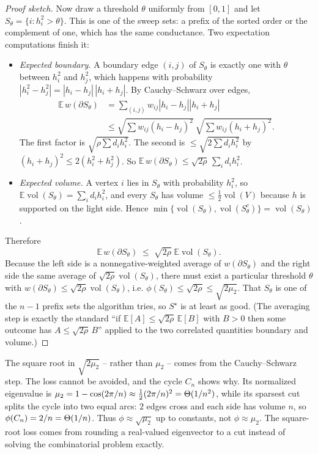 \begin{proof}[Proof sketch]
Now draw a threshold $\theta$ uniformly from $[0,1]$ and let $S_\theta=\{i:h_i^2>\theta\}$. This is one of the sweep sets: a prefix of the sorted order or the complement of one, which has the same conductance. Two expectation computations finish it:
\begin{itemize}
  \item \emph{Expected boundary.} A boundary edge $(i,j)$ of $S_\theta$ is exactly one with $\theta$ between $h_i^2$ and $h_j^2$, which happens with probability $|h_i^2-h_j^2|=|h_i-h_j|\,|h_i+h_j|$. By Cauchy--Schwarz over edges,
  \begin{align*}
    \mathbb{E}\,w(\partial S_\theta)
      &= \sum_{(i,j)}w_{ij}|h_i-h_j||h_i+h_j| \\
      &\le \sqrt{\sum w_{ij}(h_i-h_j)^2}\ \sqrt{\sum w_{ij}(h_i+h_j)^2}.
  \end{align*}
  The first factor is $\sqrt{\rho\sum d_i h_i^2}$. The second is $\le\sqrt{2\sum d_i h_i^2}$ by $(h_i+h_j)^2\le 2(h_i^2+h_j^2)$. So $\mathbb{E}\,w(\partial S_\theta)\le\sqrt{2\rho}\,\sum_i d_i h_i^2$.
  \item \emph{Expected volume.} A vertex $i$ lies in $S_\theta$ with probability $h_i^2$, so $\mathbb{E}\operatorname{vol}(S_\theta)=\sum_i d_i h_i^2$, and every $S_\theta$ has volume $\le\tfrac12\operatorname{vol}(V)$ because $h$ is supported on the light side. Hence $\min\{\operatorname{vol}(S_\theta),\operatorname{vol}(S_\theta^c)\}=\operatorname{vol}(S_\theta)$.
\end{itemize}
Therefore
\[
  \mathbb{E}\,w(\partial S_\theta)
   \;\le\; \sqrt{2\rho}\;\mathbb{E}\operatorname{vol}(S_\theta).
\]
Because the left side is a nonnegative-weighted average of $w(\partial S_\theta)$ and the right side the same average of $\sqrt{2\rho}\operatorname{vol}(S_\theta)$, there must exist a particular threshold $\theta$ with $w(\partial S_\theta)\le\sqrt{2\rho}\operatorname{vol}(S_\theta)$, i.e. $\phi(S_\theta)\le\sqrt{2\rho}\le\sqrt{2\mu_2}$. That $S_\theta$ is one of the $n-1$ prefix sets the algorithm tries, so $S^\star$ is at least as good. (The averaging step is exactly the standard ``if $\mathbb{E}[A]\le\sqrt{2\rho}\,\mathbb{E}[B]$ with $B>0$ then some outcome has $A\le\sqrt{2\rho}\,B$'' applied to the two correlated quantities boundary and volume.)
\end{proof}

\begin{whybox}
The square root in $\sqrt{2\mu_2}$ -- rather than $\mu_2$ -- comes from the Cauchy--Schwarz step. The loss cannot be avoided, and the cycle $C_n$ shows why. Its normalized eigenvalue is $\mu_2=1-\cos(2\pi/n)\approx \tfrac12(2\pi/n)^2=\Theta(1/n^2)$, while its sparsest cut splits the cycle into two equal arcs: $2$ edges cross and each side has volume $n$, so $\phi(C_n)=2/n=\Theta(1/n)$. Thus $\phi\approx\sqrt{\mu_2}$ up to constants, not $\phi\approx\mu_2$. The square-root loss comes from rounding a real-valued eigenvector to a cut instead of solving the combinatorial problem exactly.
\end{whybox}

